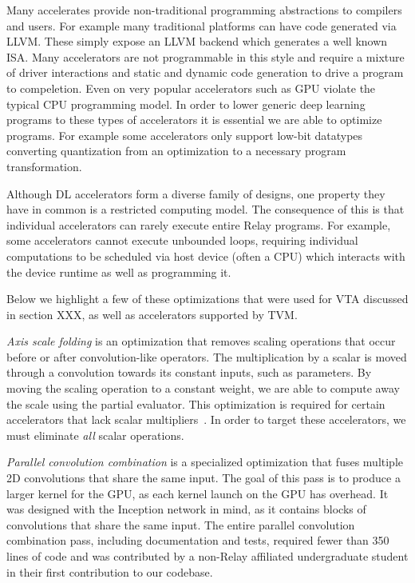 Many accelerates provide non-traditional programming
    abstractions to compilers and users.
For example many traditional platforms can have
    code generated via LLVM.
These simply expose an LLVM backend which generates
    a well known ISA.
Many accelerators are not programmable in this style
    and require a mixture of driver interactions
    and static and dynamic code generation to
    drive a program to compeletion.
Even on very popular accelerators such as GPU
    violate the typical CPU programming model.
In order to lower generic deep learning programs
    to these types of accelerators it is
    essential we are able to optimize programs.
For example some accelerators only support
    low-bit datatypes converting quantization
    from an optimization to a necessary program
    transformation.

Although DL accelerators form a diverse family of designs,
  one property they have in common is a restricted computing model.
The consequence of this is that individual accelerators
  can rarely execute entire Relay programs.
For example, some accelerators cannot execute unbounded loops,
  requiring individual computations to be scheduled via
  host device (often a CPU) which interacts with the device runtime
  as well as programming it.

Below we highlight a few of these optimizations that were used for
VTA discussed in section XXX, as well as accelerators supported by
TVM.

\textit{Axis scale folding} is an optimization that removes scaling
  operations that occur before or after convolution-like operators.
The multiplication by a scalar is moved through a convolution towards
  its constant inputs, such as parameters.
By moving the scaling operation to a constant weight, we are able
  to compute away the scale using the partial evaluator.
This optimization is required for certain accelerators that lack scalar multipliers~\citep{moreau2018vta}.
In order to target these accelerators,
  we must eliminate \textit{all} scalar operations.

\textit{Parallel convolution combination} is a specialized
  optimization that fuses multiple 2D convolutions that share the same input.
The goal of this pass is to produce a larger kernel for the GPU,
  as each kernel launch on the GPU has overhead.
It was designed with the Inception network \citep{inception} in mind, as it
  contains blocks of convolutions that share the same input.
The entire parallel convolution combination pass,
  including documentation and tests,
  required fewer than 350 lines of code and was contributed
  by a non-Relay affiliated undergraduate student
  in their first contribution to our codebase.

